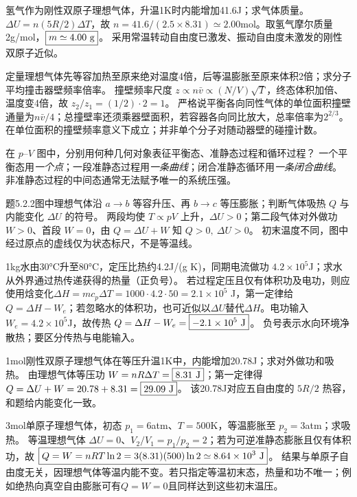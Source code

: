 \problemtext 氢气作为刚性双原子理想气体，升温1K时内能增加41.6J；求气体质量。
\workings $\Delta U=n(5R/2)\Delta T$，故 $n=41.6/(2.5\times8.31)\simeq2.00$mol。取氢气摩尔质量2g/mol，$\boxed{m\simeq4.00\ {\rm g}}$。
\crosscheck 采用常温转动自由度已激发、振动自由度未激发的刚性双原子近似。

\problemtext 定量理想气体先等容加热至原来绝对温度4倍，后等温膨胀至原来体积2倍；求分子平均撞击器壁频率倍率。
\workings 撞壁频率尺度 $z\propto n\bar v\propto (N/V)\sqrt T$，终态体积加倍、温度变4倍，故 $z_2/z_1=(1/2)\cdot2=\boxed{1}$。
\crosscheck 严格说平衡各向同性气体的单位面积撞壁通量为$n\bar v/4$；总撞壁率还须乘器壁面积，若容器各向同比放大，总率倍率为$2^{2/3}$。在单位面积的撞壁频率意义下成立；并非单个分子对随动器壁的碰撞计数。

\problemtext 在 $p$--$V$ 图中，分别用何种几何对象表征平衡态、准静态过程和循环过程？
\workings 一个平衡态用\emph{一个点}；一段准静态过程用\emph{一条曲线}；闭合准静态循环用\emph{一条闭合曲线}。
\crosscheck 非准静态过程的中间态通常无法赋予唯一的系统压强。

\problemtext 题5.2.2图中理想气体沿 $a\to b$ 等容升压、再 $b\to c$ 等压膨胀；判断气体吸热 $Q$ 与内能变化 $\Delta U$ 的符号。
\workings 两段均使 $T\propto pV$ 上升，$\Delta U>0$；第二段气体对外做功 $W>0$、首段 $W=0$，由 $Q=\Delta U+W$ 知 $\boxed{Q>0,\ \Delta U>0}$。
\crosscheck 初末温度不同，图中经过原点的虚线仅为状态标尺，不是等温线。

\problemtext 1kg水由30°C升至80°C，定压比热约4.2J/(g K)，同期电流做功 $4.2\times10^5$J；求水从外界通过热传递获得的热量（正负号）。
\workings 若过程定压且仅有体积功及电功，则应使用焓变化$\Delta H=mc_p\Delta T=1000\cdot4.2\cdot50=2.1\times10^5$ J，第一定律给$Q=\Delta H-W_e$；若忽略水的体积功，也可近似以$\Delta U$替代$\Delta H$。电功输入 $W_e=4.2\times10^5$J，故传热 $Q=\Delta H-W_e=\boxed{-2.1\times10^5\ {\rm J}}$。
\crosscheck 负号表示水向环境净散热；要区分传热与电能输入。

\problemtext 1mol刚性双原子理想气体在等压升温1K中，内能增加20.78J；求对外做功和吸热。
\workings 由理想气体等压功 $W=nR\Delta T=\boxed{8.31\ {\rm J}}$；第一定律得 $Q=\Delta U+W=20.78+8.31=\boxed{29.09\ {\rm J}}$。
\crosscheck 该20.78J对应五自由度的 $5R/2$ 热容，和题给内能变化一致。

\problemtext 3mol单原子理想气体，初态 $p_1=6$atm、$T=500$K，等温膨胀至 $p_2=3$atm；求吸热。
\workings 等温理想气体 $\Delta U=0$、$V_2/V_1=p_1/p_2=2$；若为可逆准静态膨胀且仅有体积功，故 $\boxed{Q=W=nRT\ln2=3(8.31)(500)\ln2\simeq8.64\times10^3\ {\rm J}}$。
\crosscheck 结果与单原子自由度无关，因理想气体等温内能不变。若只指定等温初末态，热量和功不唯一；例如绝热向真空自由膨胀可有$Q=W=0$且同样达到这些初末温压。

